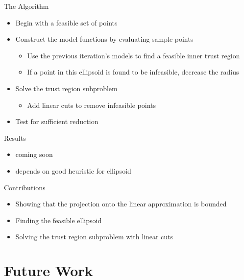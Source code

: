 \documentclass{beamer}
\begin{document}
\begin{frame}{The Algorithm}
    \begin{itemize}
        \item Begin with a feasible set of points
        \item Construct the model functions by evaluating sample points
            \begin{itemize}
                \item Use the previous iteration's models to find a feasible inner trust region
                \item If a point in this ellipsoid is found to be infeasible, decrease the radius
            \end{itemize}
        \item Solve the trust region subproblem
            \begin{itemize}
                \item Add linear cuts to remove infeasible points
            \end{itemize}
        \item Test for sufficient reduction
    \end{itemize}
\end{frame}



\begin{frame}{Results}
	\begin{itemize}
		\item coming soon
		\item depends on good heuristic for ellipsoid
	\end{itemize}
\end{frame}


\begin{frame}{Contributions}
	\begin{itemize}
		\item Showing that the projection onto the linear approximation is bounded
		\item Finding the feasible ellipsoid
		\item Solving the trust region subproblem with linear cuts
	\end{itemize}
\end{frame}



\section{Future Work}
\end{document}
